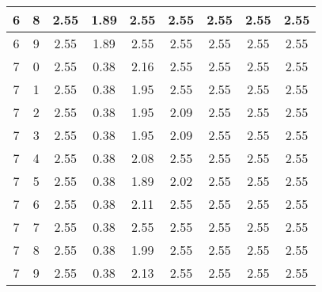 \begin{longtable}{|c|c||c||c|c|c||c|c|c|}
	6 & 8 & 2.55 & 1.89 & 2.55 & 2.55 & 2.55 & 2.55 & 2.55 \\ \hline
	6 & 9 & 2.55 & 1.89 & 2.55 & 2.55 & 2.55 & 2.55 & 2.55 \\ \hline
	7 & 0 & 2.55 & 0.38 & 2.16 & 2.55 & 2.55 & 2.55 & 2.55 \\ \hline
	7 & 1 & 2.55 & 0.38 & 1.95 & 2.55 & 2.55 & 2.55 & 2.55 \\ \hline
	7 & 2 & 2.55 & 0.38 & 1.95 & 2.09 & 2.55 & 2.55 & 2.55 \\ \hline
	7 & 3 & 2.55 & 0.38 & 1.95 & 2.09 & 2.55 & 2.55 & 2.55 \\ \hline
	7 & 4 & 2.55 & 0.38 & 2.08 & 2.55 & 2.55 & 2.55 & 2.55 \\ \hline
	7 & 5 & 2.55 & 0.38 & 1.89 & 2.02 & 2.55 & 2.55 & 2.55 \\ \hline
	7 & 6 & 2.55 & 0.38 & 2.11 & 2.55 & 2.55 & 2.55 & 2.55 \\ \hline
	7 & 7 & 2.55 & 0.38 & 2.55 & 2.55 & 2.55 & 2.55 & 2.55 \\ \hline
	7 & 8 & 2.55 & 0.38 & 1.99 & 2.55 & 2.55 & 2.55 & 2.55 \\ \hline
	7 & 9 & 2.55 & 0.38 & 2.13 & 2.55 & 2.55 & 2.55 & 2.55 \\ \hline
\end{longtable}
\clearpage{}
